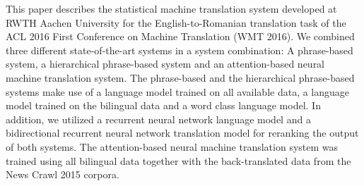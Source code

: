 This paper describes the statistical machine translation system developed at RWTH Aachen University for the English-to-Romanian translation task of the ACL 2016 First Conference on Machine Translation (WMT 2016). We combined three different state-of-the-art systems in a system combination: A phrase-based system, a hierarchical phrase-based system and an attention-based neural machine translation system. The phrase-based and the hierarchical phrase-based systems make use of a language model trained on all available data, a language model trained on the bilingual data and a word class language model. In addition, we utilized a recurrent neural network language model and a bidirectional recurrent neural network translation model for reranking the output of both systems. The attention-based neural machine translation system was trained using all bilingual data together with the back-translated data from the News Crawl 2015 corpora.
